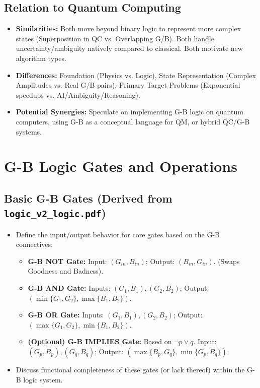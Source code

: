 \documentclass{article}
\begin{document}
\subsection{Relation to Quantum Computing}
\begin{itemize}
    \item \textbf{Similarities:} Both move beyond binary logic to represent more complex states (Superposition in QC vs. Overlapping G/B). Both handle uncertainty/ambiguity natively compared to classical. Both motivate new algorithm types.
    \item \textbf{Differences:} Foundation (Physics vs. Logic), State Representation (Complex Amplitudes vs. Real G/B pairs), Primary Target Problems (Exponential speedups vs. AI/Ambiguity/Reasoning).
    \item \textbf{Potential Synergies:} Speculate on implementing G-B logic on quantum computers, using G-B as a conceptual language for QM, or hybrid QC/G-B systems.
\end{itemize}

\section{G-B Logic Gates and Operations}

\subsection{Basic G-B Gates (Derived from \texttt{logic\_v2\_logic.pdf})}
\begin{itemize}
    \item Define the input/output behavior for core gates based on the G-B connectives:
        \begin{itemize}
            \item \textbf{G-B NOT Gate:} Input: $(G_{in}, B_{in})$; Output: $(B_{in}, G_{in})$. (Swaps Goodness and Badness).
            \item \textbf{G-B AND Gate:} Inputs: $(G_1, B_1), (G_2, B_2)$; Output: $(\min\{G_1, G_2\}, \max\{B_1, B_2\})$.
            \item \textbf{G-B OR Gate:} Inputs: $(G_1, B_1), (G_2, B_2)$; Output: $(\max\{G_1, G_2\}, \min\{B_1, B_2\})$.
            \item \textbf{(Optional) G-B IMPLIES Gate:} Based on $\neg p \lor q$. Input: $(G_p, B_p), (G_q, B_q)$; Output: $(\max\{B_p, G_q\}, \min\{G_p, B_q\})$.
        \end{itemize}
    \item Discuss functional completeness of these gates (or lack thereof) within the G-B logic system.
\end{itemize}
\end{document}
